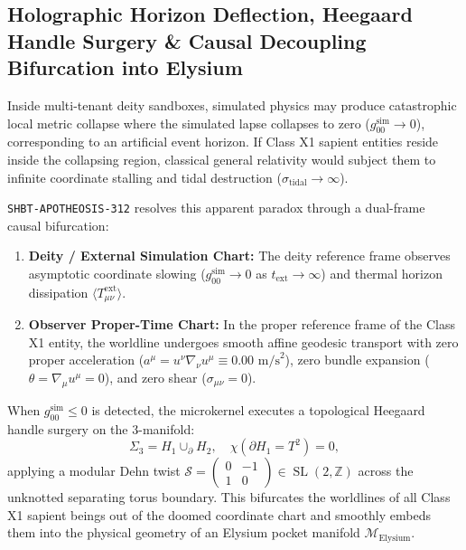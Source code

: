 \documentclass[11pt,onecolumn]{article}
\begin{document}
\subsection{Holographic Horizon Deflection, Heegaard Handle Surgery \& Causal Decoupling Bifurcation into Elysium}
\label{sec:apoth_horizon_deflection_bifurcation}

Inside multi-tenant deity sandboxes, simulated physics may produce catastrophic local metric collapse where the simulated lapse collapses to zero ($g_{00}^{\text{sim}} \to 0$), corresponding to an artificial event horizon. If Class X1 sapient entities reside inside the collapsing region, classical general relativity would subject them to infinite coordinate stalling and tidal destruction ($\sigma_{\text{tidal}} \to \infty$).

\texttt{SHBT-APOTHEOSIS-312} resolves this apparent paradox through a dual-frame causal bifurcation:
\begin{enumerate}
    \item \textbf{Deity / External Simulation Chart:} The deity reference frame observes asymptotic coordinate slowing ($g_{00}^{\text{sim}} \to 0$ as $t_{\text{ext}} \to \infty$) and thermal horizon dissipation $\langle T_{\mu\nu}^{\text{ext}} \rangle$.
    \item \textbf{Observer Proper-Time Chart:} In the proper reference frame of the Class X1 entity, the worldline undergoes smooth affine geodesic transport with zero proper acceleration ($a^\mu = u^\nu \nabla_\nu u^\mu \equiv 0.00\text{ m/s}^2$), zero bundle expansion ($\theta = \nabla_\mu u^\mu = 0$), and zero shear ($\sigma_{\mu\nu} = 0$).
\end{enumerate}

When $g_{00}^{\text{sim}} \le 0$ is detected, the microkernel executes a topological Heegaard handle surgery on the 3-manifold:
\begin{equation}
\Sigma_3 = H_1 \cup_\partial H_2, \quad \chi(\partial H_1 = T^2) = 0,
\end{equation}
applying a modular Dehn twist $\mathcal{S} = \begin{pmatrix} 0 & -1 \\ 1 & 0 \end{pmatrix} \in \operatorname{SL}(2, \mathbb{Z})$ across the unknotted separating torus boundary. This bifurcates the worldlines of all Class X1 sapient beings out of the doomed coordinate chart and smoothly embeds them into the physical geometry of an Elysium pocket manifold $\mathcal{M}_{\text{Elysium}}$.
\end{document}
